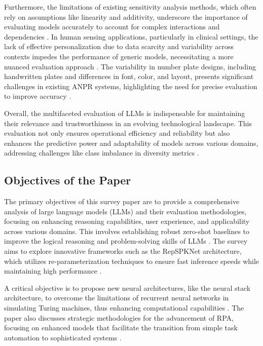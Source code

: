 Furthermore, the limitations of existing sensitivity analysis methods, which often rely on assumptions like linearity and additivity, underscore the importance of evaluating models accurately to account for complex interactions and dependencies \cite{dimov2017multidimensionalsensitivityanalysislargescale}. In human sensing applications, particularly in clinical settings, the lack of effective personalization due to data scarcity and variability across contexts impedes the performance of generic models, necessitating a more nuanced evaluation approach \cite{kaur2024cropcontextwiserobuststatic}. The variability in number plate designs, including handwritten plates and differences in font, color, and layout, presents significant challenges in existing ANPR systems, highlighting the need for precise evaluation to improve accuracy \cite{adak2022automaticnumberplaterecognition}.



Overall, the multifaceted evaluation of LLMs is indispensable for maintaining their relevance and trustworthiness in an evolving technological landscape. This evaluation not only ensures operational efficiency and reliability but also enhances the predictive power and adaptability of models across various domains, addressing challenges like class imbalance in diversity metrics \cite{pasarkar2024cousinsvendiscorefamily}.



\subsection{Objectives of the Paper} \label{subsec:Objectives of the Paper}



The primary objectives of this survey paper are to provide a comprehensive analysis of large language models (LLMs) and their evaluation methodologies, focusing on enhancing reasoning capabilities, user experience, and applicability across various domains. This involves establishing robust zero-shot baselines to improve the logical reasoning and problem-solving skills of LLMs \cite{shakarian2022reasoningcomplexnetworkslogic}. The survey aims to explore innovative frameworks such as the RepSPKNet architecture, which utilizes re-parameterization techniques to ensure fast inference speeds while maintaining high performance \cite{ma2021repworksspeakerverification}.



A critical objective is to propose new neural architectures, like the neural stack architecture, to overcome the limitations of recurrent neural networks in simulating Turing machines, thus enhancing computational capabilities \cite{stogin2022provablystableneuralnetwork}. The paper also discusses strategic methodologies for the advancement of RPA, focusing on enhanced models that facilitate the transition from simple task automation to sophisticated systems \cite{pandy2024advancementsroboticsprocessautomation}.



